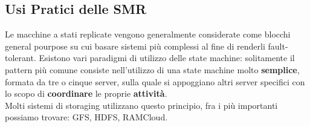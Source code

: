   \subsection{Usi Pratici delle SMR}
  Le macchine a stati replicate vengono generalmente considerate come blocchi general pourpose su cui basare sistemi più complessi al fine di renderli  fault-tolerant. Esistono vari paradigmi di utilizzo delle state machine: solitamente il pattern più comune consiste nell'utilizzo di una state machine molto \textbf{semplice}, formata da tre o cinque server, sulla quale si appoggiano altri server specifici con lo scopo di \textbf{coordinare} le proprie \textbf{attività}.\\
  Molti sistemi di storaging utilizzano questo principio, fra i più importanti possiamo trovare: GFS, HDFS, RAMCloud.
